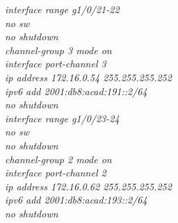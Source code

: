 \documentclass[12pt,a4paper]{report}
\begin{document}
\hspace*{2cm}\textit{interface range g1/0/21-22\\
\hspace*{2cm}no sw\\
\hspace*{2cm}no shutdown\\
\hspace*{2cm}channel-group 3 mode on \\
\hspace*{2cm}interface port-channel 3\\
\hspace*{2cm}ip address 172.16.0.54 255.255.255.252\\
\hspace*{2cm}ipv6 add 2001:db8:acad:191::2/64\\
\hspace*{2cm}no shutdown\\
\hspace*{2cm}interface range g1/0/23-24\\
\hspace*{2cm}no sw\\
\hspace*{2cm}no shutdown\\
\hspace*{2cm}channel-group 2 mode on \\
\hspace*{2cm}interface port-channel 2\\
\hspace*{2cm}ip address 172.16.0.62 255.255.255.252\\
\hspace*{2cm}ipv6 add 2001:db8:acad:193::2/64\\
\hspace*{2cm}no shutdown\\}
\end{document}
